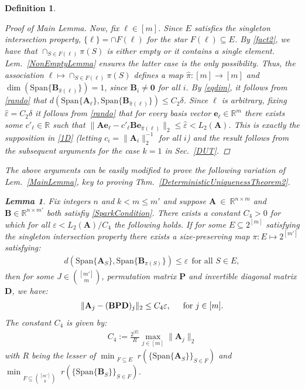 \documentclass[9pt,twocolumn]{pnas-new}
\newtheorem{lemma}{Lemma}
\newtheorem{definition}{Definition}
\begin{document}
\begin{definition}
\begin{proof}[Proof of Main Lemma]
Now, fix $\ell \in [m]$. Since $E$ satisfies the singleton intersection property, $\{\ell\} = \cap F(\ell)$ for the star $F(\ell) \subseteq E$. By \eqref{fact2}, we have that $\cap_{S \in F(\ell)} \pi(S)$ is either empty or it contains a single element. Lem.~\ref{NonEmptyLemma} ensures the latter case is the only possibility. Thus, the association $\ell \mapsto \cap_{S \in F(\ell)} \pi(S)$ defines a map $\hat \pi: [m] \to [m]$ and $\dim(\text{Span}\{\mathbf{B}_{\hat \pi(\ell)}\}) = 1$, since $\mathbf{B}_i \neq \textbf{0}$ for all $i$. By \eqref{eqdim}, it follows from \eqref{rando} that $d\left( \text{Span}\{\mathbf{A}_\ell\}, \text{Span}\{ \mathbf{B}_{\hat \pi(\ell)} \} \right) \leq C_2\delta$. Since $\ell$ is arbitrary, fixing $\hat \varepsilon = C_2\delta$ it follows from \eqref{rando} that for every basis vector $\mathbf{e}_\ell \in \mathbb{R}^m$ there exists some $c'_\ell \in \mathbb{R}$ such that $\|\mathbf{A}\mathbf{e}_\ell - c'_\ell \mathbf{B}\mathbf{e}_{\hat \pi(\ell)}\|_2 \leq \hat \varepsilon < L_2(\mathbf{A})$. This is exactly the supposition in \eqref{1D} (letting $c_i = \|\mathbf{A}_i\|_2^{-1}$ for all $i$) and the result follows from the subsequent arguments for the case $k=1$ in Sec.~\ref{DUT}.
\end{proof}

The above arguments can be easily modified to prove the following variation of Lem.~\ref{MainLemma}, key to proving Thm.~\ref{DeterministicUniquenessTheorem2}. 

\begin{lemma}\label{MainLemma2}
Fix integers $n$ and $k < m \leq m'$ and suppose $\mathbf{A}~\in~\mathbb{R}^{n \times m}$ and $\mathbf{B} \in \mathbb{R}^{n \times m'}$ both satisfiy \eqref{SparkCondition}. There exists a constant $C_4 > 0$ for which for all $\varepsilon < L_2(\mathbf{A}) / C_4$ the following holds. If for some $E \subseteq2^{[m]}$ satisfying the singleton intersection property there exists a size-preserving map $\pi: E \mapsto 2^{[m']}$ satisfying:
\begin{align}\label{GapUpperBound}
d(\text{Span}\{\mathbf{A}_{S}\}, \text{Span}\{\mathbf{B}_{\pi(S)}\}) \leq \varepsilon \ \ \text{for all $S \in E$},
\end{align}
%
then for some $J \in {[m'] \choose m}$, permutation matrix $\mathbf{P}$ and invertible diagonal matrix $\mathbf{D}$, we have:
\begin{align}\label{MainLemmaBPD}
\|\mathbf{A}_j - (\mathbf{BPD})_j\|_2 \leq C_4 \varepsilon, \indent \text{for } j \in [m].
\end{align}
The constant $C_4$ is given by:
\begin{align}\label{Cdefm'}
C_4 := \frac{2^{|E|}}{R} \max_{j \in [m]} \|\mathbf{A}_j\|_2
\end{align}
%
with $R$ being the lesser of $\min_{\substack{F \subseteq E}} r( \{ \text{Span}\{\mathbf{A}_{S}\} \}_{S \in F})$ and $\min_{\substack{F \subseteq {[m'] \choose k}}} r( \{ \text{Span}\{\mathbf{B}_{S}\} \}_{S \in F})$.
\end{lemma}


\end{definition}
\end{document}
